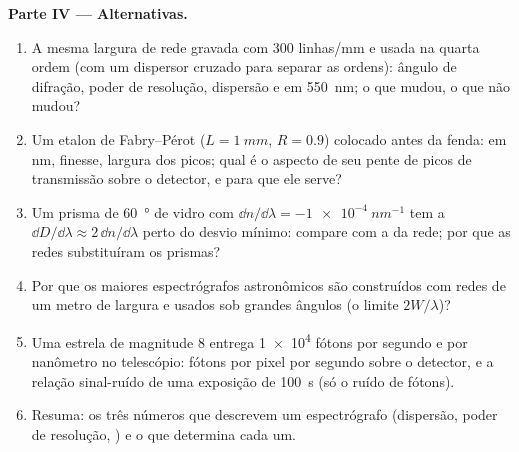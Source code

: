 \begin{problem}
\medskip
\noindent\textbf{Parte IV --- Alternativas.}
\begin{enumerate}[resume]
  \item A mesma largura de rede gravada com $300$ linhas/mm e usada na
        quarta ordem (com um dispersor cruzado para separar as ordens):
        ângulo de difração, poder de resolução, dispersão e  em \qty{550}{nm}; o que mudou, o que não mudou?
  \item Um etalon de Fabry--Pérot ($L = \qty{1}{mm}$, $R = 0.9$) colocado antes
        da fenda:  em nm, finesse, largura dos picos; qual
        é o aspecto de seu pente de picos de transmissão sobre o detector,
        e para que ele serve?
  \item Um prisma de \qty{60}{\degree} de vidro com $\dd n/\dd\lambda = \qty{-1e-4}{nm^{-1}}$
        tem a  $\dd D/\dd\lambda \approx 2\,\dd n/\dd\lambda$ perto do
        desvio mínimo: compare com a da rede; por que as redes
        substituíram os prismas?
  \item Por que os maiores espectrógrafos astronômicos são construídos com
        redes de um metro de largura e usados sob grandes ângulos (o limite
        $2W/\lambda$)?
  \item Uma estrela de magnitude 8 entrega \qty{1e4}{} fótons por segundo e
        por nanômetro no telescópio: fótons por pixel por segundo
        sobre o detector, e a relação sinal-ruído de uma exposição de \qty{100}{s}
        (só o ruído de fótons).
  \item Resuma: os três números que descrevem um espectrógrafo
        (dispersão, poder de resolução, ) e o que
        determina cada um.
\end{enumerate}
\end{problem}
